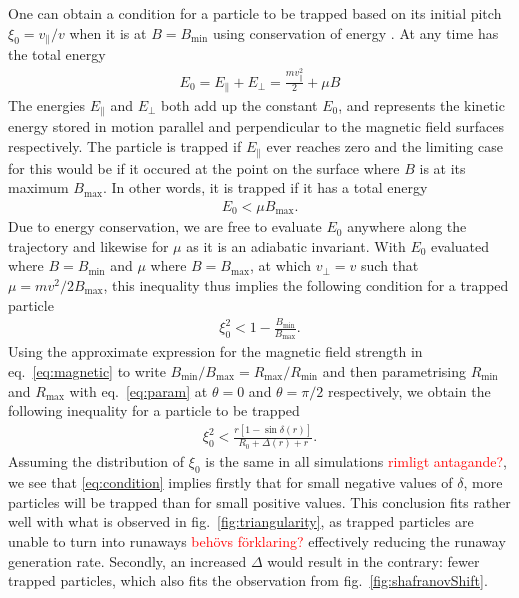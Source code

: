 \documentclass[11pt,a4paper]{article}
\begin{document}
One can obtain a condition for a particle to be trapped based on its initial pitch $\xi_0=v_\parallel/v$ when it is at $B=B_\text{min}$ using conservation of energy \cite{hoppe}.
At any time has the total energy
\begin{align*}
    E_0
    =E_\parallel + E_\perp
    =\frac{mv_\parallel^2}{2}+\mu B
\end{align*}
The energies $E_\parallel$ and $E_\perp$ both add up the constant $E_0$, and represents the kinetic energy stored in motion parallel and perpendicular to the magnetic field surfaces respectively.
The particle is trapped if $E_\parallel$ ever reaches zero and the limiting case for this would be if it occured at the point on the surface where $B$ is at its maximum $B_\text{max}$.
In other words, it is trapped if it has a total energy
\begin{align*}
    E_0
    <\mu B_\text{max}.
\end{align*}
Due to energy conservation, we are free to evaluate $E_0$ anywhere along the trajectory and likewise for $\mu$ as it is an adiabatic invariant.
With $E_0$ evaluated where $B=B_\text{min}$ and $\mu$ where $B=B_\text{max}$, at which $v_\perp=v$ such that $\mu=mv^2/2B_\text{max}$, this inequality thus implies the following condition for a trapped particle
\begin{align*}
    \xi_0^2
    <1-\frac{B_\text{min}}{B_\text{max}}.
\end{align*}
Using the approximate expression for the magnetic field strength in eq.\ \eqref{eq:magnetic} to write $B_\text{min}/B_\text{max}=R_\text{max}/R_\text{min}$ and then parametrising $R_\text{min}$ and $R_\text{max}$ with eq.\ \eqref{eq:param} at $\theta=0$ and $\theta=\pi/2$ respectively, we obtain the following inequality for a particle to be trapped
\begin{align}
    \label{eq:condition}
    \xi_0^2
    <\frac{r[1-\sin\delta(r)]}{R_0+\Delta(r)+r}.
\end{align}
Assuming the distribution of $\xi_0$ is the same in all simulations \textcolor{red}{rimligt antagande?}, we see that \eqref{eq:condition} implies firstly that for small negative values of $\delta$, more particles will be trapped than for small positive values.
This conclusion fits rather well with what is observed in fig.\ \ref{fig:triangularity}, as trapped particles are unable to turn into runaways \textcolor{red}{behövs förklaring?} effectively reducing the runaway generation rate.
Secondly, an increased $\Delta$ would result in the contrary: fewer trapped particles, which also fits the observation from fig.\ \ref{fig:shafranovShift}.
\end{document}
